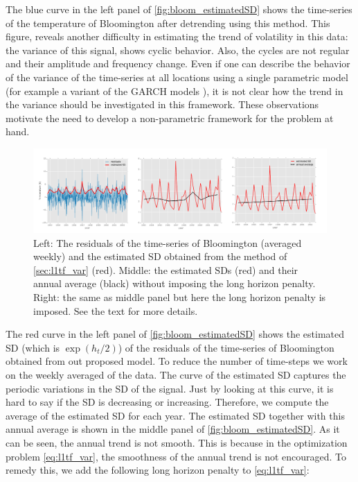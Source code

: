 \documentclass{article}
\begin{document}
The blue curve in the left panel of \autoref{fig:bloom_estimatedSD} shows the time-series of the temperature of Bloomington after detrending using this method. This figure, reveals another difficulty in estimating the trend of volatility in this data: the variance of this signal, shows cyclic behavior. Also, the cycles are not regular and their amplitude and frequency change. Even if one can describe the behavior of the variance of the time-series at all locations using a single parametric model (for example a variant of the GARCH models \citep{bollerslev_generalized_1986}), it is not clear how the trend in the variance should be investigated in this framework. These observations motivate the need to develop a non-parametric framework for the problem at hand.

\begin{figure}[tb]
  \centering
  \includegraphics[width=\columnwidth]{Figures/bloom_estimatedSD}
  \caption{Left: The residuals of the time-series of Bloomington
    (averaged weekly) and the estimated SD obtained from the method of
    \autoref{sec:l1tf_var} (red). Middle: the estimated SDs (red) and
    their annual average (black) without imposing the long horizon
    penalty. Right: the same as middle panel but here the long horizon
    penalty is imposed. See the text for more details.} 
  \label{fig:bloom_estimatedSD}
\end{figure} 


The red curve in the left panel of \autoref{fig:bloom_estimatedSD}
shows the estimated SD (which is $\exp(h_t/2)$) of the residuals of
the time-series of Bloomington obtained from out proposed model. To reduce the number of time-steps we work on the weekly averaged of the data. The curve of the estimated SD captures the periodic variations in the
SD of the signal. Just by looking at this curve, it is hard to say if
the SD is decreasing or increasing. Therefore, we compute the average
of the estimated SD for each year. The estimated SD together with this
annual average is shown in the middle panel of
\autoref{fig:bloom_estimatedSD}. As it can be seen, the annual trend
is not smooth. This is because in the optimization problem
\eqref{eq:l1tf_var}, the smoothness of the annual trend is not
encouraged. To remedy this, we add the following long horizon penalty to \eqref{eq:l1tf_var}:
 
\end{document}
